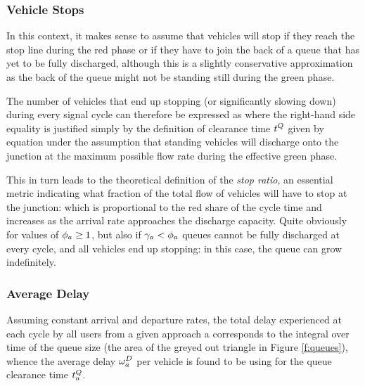 \subsubsection*{Vehicle Stops}
In this context, it makes sense to assume that vehicles will stop if they reach the stop line during the red phase or if they have to join the back of a queue that has yet to be fully discharged, although this is a slightly conservative approximation as the back of the queue might not be standing still during the green phase.

The number of vehicles that end up stopping (or significantly slowing down) during every signal cycle can therefore be expressed as
where the right-hand side equality is justified simply by the definition of clearance time $t_{}^Q$ given by equation  under the assumption that standing vehicles will discharge onto the junction at the maximum possible flow rate during the effective green phase. 

This in turn leads to the theoretical definition of the \emph{stop ratio}, an essential metric indicating what fraction of the total flow of vehicles will have to stop at the junction:
which is proportional to the red share of the cycle time and increases as the arrival rate approaches the discharge capacity.
Quite obviously for values of $\phi_a \geq 1$, but also if $\gamma_{a} < \phi_a$ queues cannot be fully discharged at every cycle, and all vehicles end up stopping: in this case, the queue can grow indefinitely.


\subsubsection*{Average Delay}
Assuming constant arrival and departure rates, the total delay experienced at each cycle by all users from a given approach a corresponds to the integral over time of the queue size (the area of the greyed out triangle in Figure \ref{f:queues}), whence the average delay $\omega_{a}^{D}$ per vehicle is found to be
using  for the queue clearance time $t_{a}^Q$.

